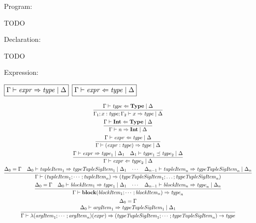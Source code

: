 Program:

TODO

Declaration:

TODO

Expression:

$\fbox{$\Gamma \vdash \mathit{expr} \Rightarrow \mathit{type} \mid \Delta$}$
$\fbox{$\Gamma \vdash \mathit{expr} \Leftarrow \mathit{type} \mid \Delta$}$

\begin{gather*}
  \infer{\Gamma_1; x: \mathit{type}; \Gamma_2 \vdash x \Rightarrow \mathit{type} \mid \Delta}{
    \Gamma \vdash \mathit{type} \Leftarrow \mathbf{Type} \mid \Delta
  }
  \\
  \infer{\Gamma \vdash n \Rightarrow \mathbf{Int} \mid \Delta}{
    \Gamma \vdash \mathbf{Int} \Leftarrow \mathbf{Type} \mid \Delta
  }
  \\
  \infer{\Gamma \vdash (\mathit{expr}: \mathit{type}) \Rightarrow \mathit{type} \mid \Delta}{
    \Gamma \vdash \mathit{expr} \Leftarrow \mathit{type} \mid \Delta
  }
  \\
  \infer{\Gamma \vdash \mathit{expr} \Leftarrow \mathit{type}_2 \mid \Delta}{
    \Gamma \vdash \mathit{expr} \Rightarrow \mathit{type}_1 \mid \Delta_1
    &
    \Delta_1 \vdash \mathit{type}_1 \preceq \mathit{type}_2 \mid \Delta
  }
  \\
  \infer{\Gamma \vdash (\mathit{tupleItem}_1; \cdots; \mathit{tupleItem}_n) \Rightarrow (\mathit{typeTupleSigItem}_1; \ldots; \mathit{typeTupleSigItem}_n)}{
    \Delta_0 = \Gamma
    &
    \Delta_0 \vdash \mathit{tupleItem}_1 \Rightarrow \mathit{typeTupleSigItem}_1 \mid \Delta_1
    &
    \cdots
    &
    \Delta_{n - 1} \vdash \mathit{tupleItem}_n \Rightarrow \mathit{typeTupleSigItem}_n \mid \Delta_n
  }
  \\
  \infer{\Gamma \vdash \mathbf{block}(\mathit{blockItem}_1; \cdots; \mathit{blockItem}_n) \Rightarrow \mathit{type}_n}{
    \Delta_0 = \Gamma
    &
    \Delta_0 \vdash \mathit{blockItem}_1 \Rightarrow \mathit{type}_1 \mid \Delta_1
    &
    \cdots
    &
    \Delta_{n - 1} \vdash \mathit{blockItem}_n \Rightarrow \mathit{type}_n \mid \Delta_n
  }
  \\
  \infer{\Gamma \vdash \lambda(\mathit{argItem}_1; \cdots; \mathit{argItem}_n)(\mathit{expr}) \Rightarrow (\mathit{typeTupleSigItem}_1; \cdots; \mathit{typeTupleSigItem}_n) \rightarrow \mathit{type}}{
    \begin{array}{c}
      \Delta_0 = \Gamma
      \\
      \Delta_0 \vdash \mathit{argItem}_1 \Rightarrow \mathit{typeTupleSigItem}_1 \mid \Delta_1

\end{array}}
\end{gather*}
